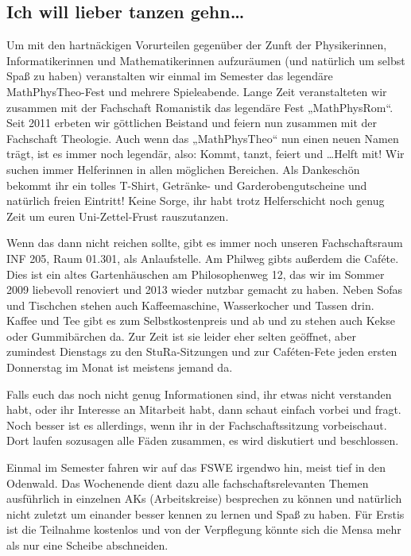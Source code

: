 \subsection{Ich will lieber tanzen gehn\dots}
Um mit den hartnäckigen Vorurteilen gegenüber der Zunft der Physikerinnen, Informatikerinnen und Mathematikerinnen aufzuräumen (und natürlich um selbst Spaß zu haben) veranstalten wir einmal im Semester das legendäre MathPhysTheo-Fest und mehrere Spieleabende. Lange Zeit veranstalteten wir zusammen mit der Fachschaft Romanistik das legendäre Fest „MathPhysRom“. Seit 2011 erbeten wir göttlichen Beistand und feiern nun zusammen mit der Fachschaft Theologie. Auch wenn das „MathPhysTheo“ nun einen neuen Namen trägt, ist es immer noch legendär, also: Kommt, tanzt, feiert und \dots Helft mit! Wir suchen immer Helferinnen in allen möglichen Bereichen. Als Dankeschön bekommt ihr ein tolles T-Shirt, Getränke- und Garderobengutscheine und natürlich freien Eintritt! Keine Sorge, ihr habt trotz Helferschicht noch genug Zeit um euren Uni-Zettel-Frust rauszutanzen.

Wenn das dann nicht reichen sollte, gibt es immer noch unseren Fachschaftsraum INF 205, Raum 01.301, als Anlaufstelle. Am Philweg gibts außerdem die Caféte. Dies ist ein altes Gartenhäuschen am Philosophenweg 12, das wir im Sommer 2009 liebevoll renoviert und 2013 wieder nutzbar gemacht zu haben. Neben Sofas und Tischchen stehen auch Kaffeemaschine, Wasserkocher und Tassen drin. Kaffee und Tee gibt es zum Selbstkostenpreis und ab und zu stehen auch Kekse oder Gummibärchen da. Zur Zeit ist sie leider eher selten geöffnet, aber zumindest Dienstags zu den \gls{StuRa}-Sitzungen und zur Caféten-Fete jeden ersten Donnerstag im Monat ist meistens jemand da.

Falls euch das noch nicht genug Informationen sind, ihr etwas nicht verstanden habt, oder ihr Interesse an Mitarbeit habt, dann schaut einfach vorbei und fragt. Noch besser ist es allerdings, wenn ihr in der Fachschaftssitzung vorbeischaut. Dort laufen sozusagen alle Fäden zusammen, es wird diskutiert und beschlossen.

Einmal im Semester fahren wir auf das \gls{FSWE} irgendwo hin, meist tief in den Odenwald. Das Wochenende dient dazu alle fachschaftsrelevanten Themen ausführlich in einzelnen AKs (Arbeitskreise) besprechen zu können und natürlich nicht zuletzt um einander besser kennen zu lernen und Spaß zu haben. Für Erstis ist die Teilnahme kostenlos und von der Verpflegung könnte sich die Mensa mehr als nur eine Scheibe abschneiden.
